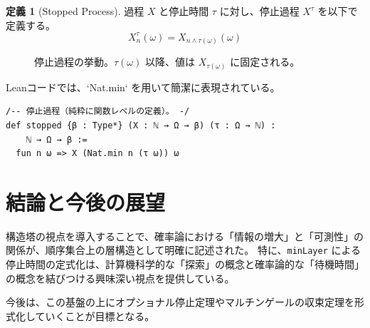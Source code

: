 \documentclass[a4paper,11pt]{article}
\theoremstyle{definition}
\newtheorem{definition}{定義}[section]
\theoremstyle{plain}
\begin{document}
\begin{definition}[Stopped Process]
過程 $X$ と停止時間 $\tau$ に対し、停止過程 $X^\tau$ を以下で定義する。
\[ X^\tau_n(\omega) = X_{n \land \tau(\omega)}(\omega) \]
\end{definition}

\begin{figure}[htbp]
\centering
{}
\caption{停止過程の挙動。$\tau(\omega)$ 以降、値は $X_{\tau(\omega)}$ に固定される。}
\end{figure}

Leanコードでは、`Nat.min` を用いて簡潔に表現されている。

\begin{lstlisting}[caption=停止過程の定義]
/-- 停止過程（純粋に関数レベルの定義）。 -/
def stopped {β : Type*} (X : ℕ → Ω → β) (τ : Ω → ℕ) :
    ℕ → Ω → β :=
  fun n ω => X (Nat.min n (τ ω)) ω
\end{lstlisting}

\section{結論と今後の展望}
構造塔の視点を導入することで、確率論における「情報の増大」と「可測性」の関係が、順序集合上の層構造として明確に記述された。
特に、\texttt{minLayer} による停止時間の定式化は、計算機科学的な「探索」の概念と確率論的な「待機時間」の概念を結びつける興味深い視点を提供している。

今後は、この基盤の上にオプショナル停止定理やマルチンゲールの収束定理を形式化していくことが目標となる。
\end{document}
